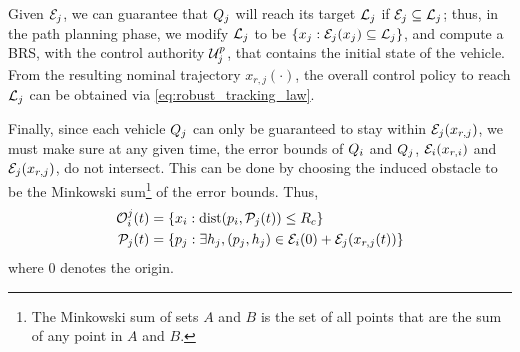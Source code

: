 Given $\mathcal{E}_j$, we can guarantee that $Q_j$ will reach its target $\mathcal{L}_j$ if $\mathcal{E}_j \subseteq \mathcal{L}_j$; thus, in the path planning phase, we modify $\mathcal{L}_j$ to be $\{x_j: \mathcal{E}_j(x_j) \subseteq \mathcal{L}_j\}$, and compute a BRS, with the control authority $\mathcal{U}^p_j$, that contains the initial state of the vehicle. From the resulting nominal trajectory $x_{r,j}(\cdot)$, the overall control policy to reach $\mathcal{L}_j$ can be obtained via \eqref{eq:robust_tracking_law}.

Finally, since each vehicle $Q_j$ can only be guaranteed to stay within $\mathcal{E}_j(x_{r,j})$, we must make sure at any given time, the error bounds of $Q_i$ and $Q_j$, $\mathcal{E}_i(x_{r,i})$ and $\mathcal{E}_j(x_{r,j})$, do not intersect. This can be done by choosing the induced obstacle to be the Minkowski sum\footnote{The Minkowski sum of sets $A$ and $B$ is the set of all points that are the sum of any point in $A$ and $B$.} of the error bounds. Thus,
\vspace{-0.3em}
\begin{equation}
\begin{aligned}
\mathcal{O}_i^j(t) &= \{x_i: \text{dist}(p_i, \mathcal{P}_j(t)) \le R_c \} \\
\mathcal{P}_j(t) &= \{p_j: \exists h_j, (p_j, h_j) \in \mathcal{E}_i(0) + \mathcal{E}_j(x_{r,j}(t)) \}
\end{aligned}
\end{equation}
\noindent where $0$ denotes the origin. 



